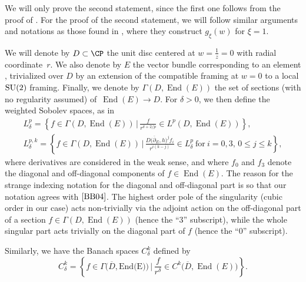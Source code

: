 We will only prove the second statement, since the first one follows from the proof of \cite[Theorem 7]{B2}. For the proof of the second statement, we will follow similar arguments and notations as those found in \cite{BB04}, where they construct $g_{\xi}(w)$ for $\xi=1$.

We will denote by $D \subset \CP$ the unit disc centered at $w=\frac{1}{z}=0$ with radial coordinate~$r$. We also denote by $E$ the vector bundle corresponding to an element , trivialized over $D$ by an extension of the compatible framing at $w=0$ to a local ${\rm SU}(2)$ framing. Finally, we denote by $\Gamma(D,\operatorname{End}(E))$ the set of sections (with no regularity assumed) of~${\operatorname{End}(E)\to D}$. For $\delta >0$, we then define the weighted Sobolev spaces, as in \cite{BB04}
\begin{gather*}
 L_{\delta}^p=\left\{ f\in \Gamma(D,\operatorname{End}(E)) \,\Big|\, \frac{f}{r^{\delta +2/p}} \in L^p(D,\operatorname{End}(E))\right\},\\
 L_{\delta}^{p,k}=\left\{ f\in \Gamma(D,\operatorname{End}(E)) \,\Big|\, \frac{D\bigl(\overline{\partial}_E,h\bigr)^{j}f_i}{r^{i(k-j)}} \in L^p_{\delta} \ \text{for}\ i=0,3,\, 0\leq j \leq k\right\},
\end{gather*}
where derivatives are considered in the weak sense, and where $f_0$ and $f_3$ denote the diagonal and off-diagonal components of $f\in \operatorname{End}(E)$. The reason for the strange indexing notation for the diagonal and off-diagonal part is so that our notation agrees with $\cite{BB04}$. The highest order pole of the singularity (cubic order in our case) acts non-trivially via the adjoint action on the off-diagonal part of a section $f\in \Gamma(D,\operatorname{End}(E))$ (hence the ``$3$'' subscript), while the whole singular part acts trivially on the diagonal part of $f$ (hence the ``$0$'' subscript).

Similarly, we have the Banach spaces $C^k_{\delta}$ defined by
\begin{equation*}
 C^k_{\delta}=\left\{ f \in \Gamma\bigl(\overline{D},\text{End(E)}\bigr) \,\Big|\, \frac{f}{r^{\delta}} \in C^k\bigl(\overline{D},\operatorname{End}(E)\bigr)\right\}.
\end{equation*}

